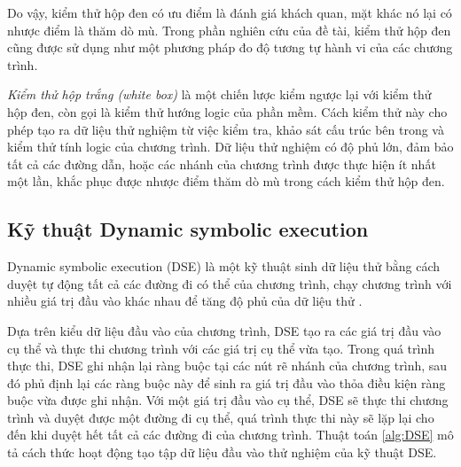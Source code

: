 Do vậy, kiểm thử hộp đen có ưu điểm là đánh giá khách quan, mặt khác
nó lại có nhược điểm là thăm dò mù. Trong phần nghiên cứu của đề tài,
kiểm thử hộp đen cũng được sử dụng như một phương pháp đo độ tương tự
hành vi của các chương trình.
		
\emph{Kiểm thử hộp trắng (white box)} là một chiến lược kiểm ngược lại
với kiểm thử hộp đen, còn gọi là kiểm thử hướng logic của phần
mềm. Cách kiểm thử này cho phép tạo ra dữ liệu thử nghiệm từ việc kiểm
tra, khảo sát cấu trúc bên trong và kiểm thử tính logic của chương
trình. Dữ liệu thử nghiệm có độ phủ lớn, đảm bảo tất cả các đường dẫn,
hoặc các nhánh của chương trình được thực hiện ít nhất một lần, khắc
phục được nhược điểm thăm dò mù trong cách kiểm thử hộp đen.			

\subsection{Kỹ thuật Dynamic symbolic execution}
\label{sec:dse}

Dynamic symbolic execution (DSE) là một kỹ thuật sinh dữ liệu thử bằng
cách duyệt tự động tất cả các đường đi có thể của chương trình, chạy 
chương trình với nhiều giá trị đầu vào khác nhau để tăng độ
phủ của dữ liệu thử \cite{xie2009fitness,cadar2013symbolic}.

Dựa trên kiểu dữ liệu đầu vào của chương trình, DSE tạo ra các giá trị 
đầu vào cụ thể và thực thi chương trình với các giá trị cụ thể vừa tạo. 
Trong quá trình thực thi, DSE ghi nhận lại ràng buộc tại các nút rẽ nhánh 
của chương trình, sau đó phủ định lại các ràng buộc này để sinh ra giá 
trị đầu vào thỏa điều kiện ràng buộc vừa được ghi nhận. Với một giá trị 
đầu vào cụ thể, DSE sẽ thực thi chương trình và duyệt được một đường đi 
cụ thể, quá trình thực thi này sẽ lặp lại cho đến khi duyệt hết tất cả 
các đường đi của chương trình. Thuật toán \ref{alg:DSE} mô tả cách thức hoạt
động tạo tập dữ liệu đầu vào thử nghiệm của kỹ thuật DSE.

